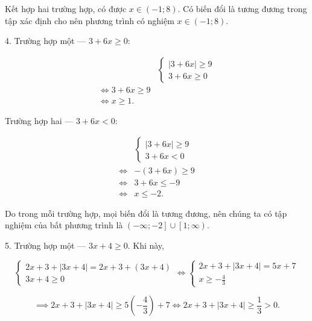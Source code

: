 Kết hợp hai trường hợp, có được $x \in \left(-1; 8\right)$. Có biến đổi là tương đương trong tập xác định cho nên phương trình có nghiệm $x \in \left(-1; 8\right)$.

4. \textcolor{colorEmphasisCyan}{Trường hợp một --- $3 + 6x \geq 0$}:

\begin{align*}
   &\begin{cases}
      |3 + 6x| \geq 9 \\
      3 + 6x \geq 0
   \end{cases} \\
   \iff 3 + 6x \geq 9 \\
   \iff x \geq 1.
\end{align*}

\textcolor{colorEmphasis}{Trường hợp hai --- $3 + 6x < 0$}:

\begin{align*}
   &\begin{cases}
      |3 + 6x| \geq 9 \\
      3 + 6x < 0
   \end{cases} \\
   \iff &-(3 + 6x) \geq 9 \\
   \iff &3 + 6x \leq -9 \\
   \iff &x \leq -2.
\end{align*}

Do trong mỗi trường hợp, mọi biến đổi là tương đương, nên chúng ta có tập nghiệm của bất phương trình là $\left(-\infty; -2\right] \cup \left[1; \infty\right)$.

5. \textcolor{colorEmphasisCyan}{Trường hợp một --- $3x + 4 \geq 0$}. Khi này, 

\begin{equation*}
   \begin{cases}
      2x + 3 + |3x + 4| = 2x + 3 + (3x + 4) \\
      3x + 4 \geq 0
   \end{cases} \iff \begin{cases}
      2x + 3 + |3x + 4| = 5x + 7 \\
      x \geq -\frac{4}{3}
   \end{cases}
\end{equation*}

\begin{equation*}
   \implies 2x + 3 + |3x + 4| \geq 5 \left(-\frac{4}{3}\right) + 7 \iff 2x + 3 + |3x + 4| \geq \frac{1}{3} > 0.
\end{equation*}

